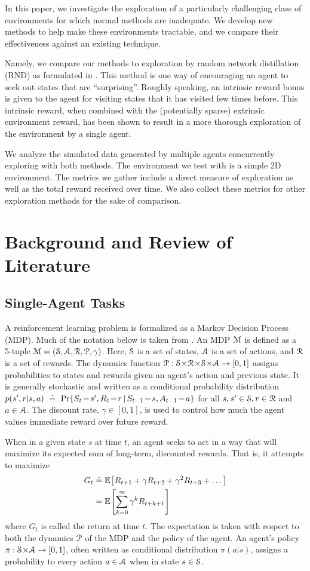 \documentclass[12pt,journal,compsoc]{IEEEtran}
\begin{document}
	In this paper, we investigate the exploration of a particularly challenging class of environments for which normal methods are inadequate. We develop new methods to help make these environments tractable, and we compare their effectiveness against an existing technique.
	
	Namely, we compare our methods to exploration by random network distillation (RND) as formulated in \cite{rnd}. This method is one way of encouraging an agent to seek out states that are ``surprising''. Roughly speaking, an intrinsic reward bonus is given to the agent for visiting states that it has visited few times before. This intrinsic reward, when combined with the (potentially sparse) extrinsic environment reward, has been shown to result in a more thorough exploration of the environment by a single agent. 
	
	We analyze the simulated data generated by multiple agents concurrently exploring with both methods. The environment we test with is a simple 2D environment. The metrics we gather include a direct measure of exploration as well as the total reward received over time. We also collect these metrics for other exploration methods for the sake of comparison. 
	
	\section{Background and Review of Literature}
	\subsection{Single-Agent Tasks}
	A reinforcement learning problem is formalized as a Markov Decision Process (MDP). Much of the notation below is taken from \cite{sutton_and_barto}. An MDP ${\mathcal M}$ is defined as a 5-tuple $\M = (\S, \A, \R, \P, \gamma)$. Here, $\S$ is a set of states, $\A$ is a set of actions, and $\R$ is a set of rewards. The dynamics function $\P: \S \!\cross\! \R \!\cross\! \S \!\cross\! \A \to [0,1]$ assigns probabilities to states and rewards given an agent's action and previous state. It is generally stochastic and written as a conditional probability distribution $p(s',r|s,a)~\defeq~\Pr{S_t\!=\!s', R_t\!=\!r\,|\, S_{t-1}\!=\!s, A_{t-1}\!=\!a}$ for all $s,s' \in \S, r \in \R$ and $a \in \A$. The discount rate, $\gamma \in [0,1]$, is used to control how much the agent values immediate reward over future reward.
	
	When in a given state $s$ at time $t$, an agent seeks to act in a way that will maximize its expected sum of long-term, discounted rewards. That is, it attempts to maximize
	\begin{align}
	G_t &\doteq \mathbb{E}_{\,\!\!}\left[R_{t+1}+\gamma R_{t+2}+\gamma^2 R_{t+3} +\dots\right]\notag\\
	&= \mathbb{E}_{\,\!\!}\left[\sum\limits_{k=0}^{\infty} \gamma^k R_{t+k+1}\right]\notag
	\end{align}
	where $G_t$ is called the return at time $t$. The expectation is taken with respect to both the dynamics $\P$ of the MDP and the policy of the agent. An agent's policy $\pi:\S \!\cross\! \A \to [0,1]$, often written as conditional distribution $\pi(a|s)$, assigns a probability to every action $a \in \A$ when in state $s \in \S$.
	
\end{document}
